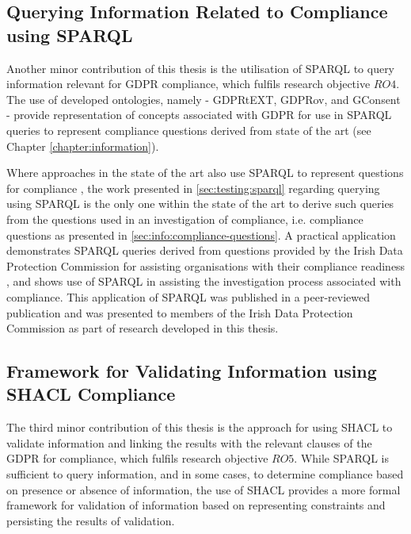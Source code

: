 \subsection{Querying Information Related to Compliance using SPARQL}\label{sec:contributions:querying}
Another minor contribution of this thesis is the utilisation of SPARQL to query  information relevant for GDPR compliance, which fulfils research objective $RO4$.
The use of developed ontologies, namely - GDPRtEXT, GDPRov, and GConsent - provide representation of concepts associated with GDPR for use in SPARQL queries to represent compliance questions derived from state of the art (see Chapter \ref{chapter:information}).

Where approaches in the state of the art also use SPARQL to represent questions for compliance \cite{agarwal_legislative_2018,palmirani_pronto:_2018}, the work presented in \autoref{sec:testing:sparql} regarding querying using SPARQL is the only one within the state of the art to derive such queries from the questions used in an investigation of compliance, i.e. compliance questions as presented in \autoref{sec:info:compliance-questions}.
A practical application demonstrates SPARQL queries derived from questions provided by the Irish Data Protection Commission for assisting organisations with their compliance readiness \cite{noauthor_gdpr_2017}, and shows use of SPARQL in assisting the investigation process associated with compliance.
This application of SPARQL was published in a peer-reviewed publication \cite{pandit_queryable_2018} and was presented to members of the Irish Data Protection Commission as part of research developed in this thesis.

\subsection{Framework for Validating Information using SHACL Compliance}\label{sec:contributions:validation}
The third minor contribution of this thesis is the approach for using SHACL to validate information and linking the results with the relevant clauses of the GDPR for compliance, which fulfils research objective $RO5$.
While SPARQL is sufficient to query information, and in some cases, to determine compliance based on presence or absence of information, the use of SHACL provides a more formal framework for validation of information based on representing constraints and persisting the results of validation.

